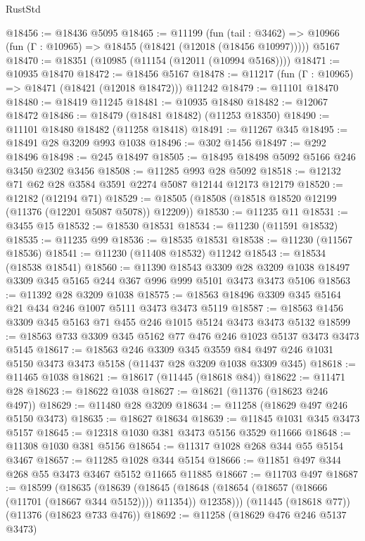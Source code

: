 \begin{lexlean}{RustStd}
\begin{coremodule}
{{{{{{{{{{{{{{{{{{{@18456 := @18436 @5095
@18465 := @11199
    (fun (tail : @3462) => @10966 (fun (Γ : @10965) => @18455 (@18421 (@12018 (@18456 @10997)))))
    @5167
@18470 := @18351 (@10985 (@11154 (@12011 (@10994 @5168))))
@18471 := @10935 @18470
@18472 := @18456 @5167
@18478 := @11217 (fun (Γ : @10965) => @18471 (@18421 (@12018 @18472))) @11242
@18479 := @11101 @18470
@18480 := @18419 @11245
@18481 := @10935 @18480
@18482 := @12067 @18472
@18486 := @18479 (@18481 @18482) (@11253 @18350)
@18490 := @11101 @18480 @18482 (@11258 @18418)
@18491 := @11267 @345
@18495 := @18491 @28 @3209 @993 @1038
@18496 := @302 @1456
@18497 := @292 @18496
@18498 := @245 @18497
@18505 := @18495 @18498 @5092 @5166 @246 @3450 @2302 @3456
@18508 := @11285 @993 @28 @5092
@18518 := @12132 @71 @62 @28 @3584 @3591 @2274 @5087 @12144 @12173 @12179
@18520 := @12182 (@12194 @71)
@18529 := @18505 (@18508 (@18518 @18520 @12199 (@11376 (@12201 @5087 @5078)) @12209))
@18530 := @11235 @11
@18531 := @3455 @15
@18532 := @18530 @18531
@18534 := @11230 (@11591 @18532)
@18535 := @11235 @99
@18536 := @18535 @18531
@18538 := @11230 (@11567 @18536)
@18541 := @11230 (@11408 @18532) @11242
@18543 := @18534 (@18538 @18541)
@18560 := @11390
    @18543
    @3309
    @28
    @3209
    @1038
    @18497
    @3309
    @345
    @5165
    @244
    @367
    @996
    @999
    @5101
    @3473
    @3473
    @5106
@18563 := @11392 @28 @3209 @1038
@18575 := @18563 @18496 @3309 @345 @5164 @21 @434 @246 @1007 @5111 @3473 @3473 @5119
@18587 := @18563 @1456 @3309 @345 @5163 @71 @455 @246 @1015 @5124 @3473 @3473 @5132
@18599 := @18563 @733 @3309 @345 @5162 @77 @476 @246 @1023 @5137 @3473 @3473 @5145
@18617 := @18563
    @246
    @3309
    @345
    @3559
    @84
    @497
    @246
    @1031
    @5150
    @3473
    @3473
    @5158
    (@11437 @28 @3209 @1038 @3309 @345)
@18618 := @11465 @1038
@18621 := @18617 (@11445 (@18618 @84))
@18622 := @11471 @28
@18623 := @18622 @1038
@18627 := @18621 (@11376 (@18623 @246 @497))
@18629 := @11480 @28 @3209
@18634 := @11258 (@18629 @497 @246 @5150 @3473)
@18635 := @18627 @18634
@18639 := @11845 @1031 @345 @3473 @5157
@18645 := @12318 @1030 @381 @3473 @5156 @3529 @11666
@18648 := @11308 @1030 @381 @5156
@18654 := @11317 @1028 @268 @344 @55 @5154 @3467
@18657 := @11285 @1028 @344 @5154
@18666 := @11851 @497 @344 @268 @55 @3473 @3467 @5152 @11665 @11885
@18667 := @11703 @497
@18687 := @18599
    (@18635
      (@18639
        (@18645 (@18648 (@18654 (@18657 (@18666 (@11701 (@18667 @344 @5152)))) @11354)) @12358)))
    (@11445 (@18618 @77))
    (@11376 (@18623 @733 @476))
@18692 := @11258 (@18629 @476 @246 @5137 @3473)
}}}}}}}}}}}}}}}}}}}
\end{coremodule}
\end{lexlean}
